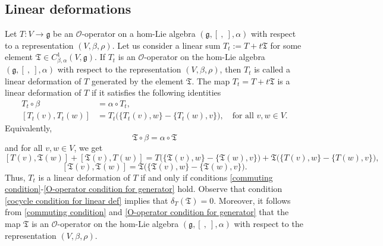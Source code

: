 \documentclass[a4paper,11pt]{amsart}
\theoremstyle{plain}
\theoremstyle{definition}
\theoremstyle{remark}
\numberwithin{equation}{section}
\begin{document}
\subsection{Linear deformations}
Let $T:V\rightarrow \mathfrak{g}$ be an $\mathcal{O}$-operator on a hom-Lie algebra $(\mathfrak{g},[~,~],\alpha)$  with respect to a representation $(V,\beta,\rho)$. Let us consider a linear sum $T_t:=T+t\mathfrak{T}$ for some element $\mathfrak{T}\in C^1_{\beta,\alpha}(V,\mathfrak{g})$. If $T_t$ is an $\mathcal{O}$-operator on the hom-Lie algebra $(\mathfrak{g},[~,~],\alpha)$ with respect to the representation $(V,\beta,\rho)$, then $T_t$ is called a linear deformation of $T$ generated by the element $\mathfrak{T}$. The map $T_t=T+t\mathfrak{T}$ is a linear deformation of $T$ if it satisfies the following identities
\begin{align*}
T_t\circ \beta&=\alpha\circ T_t,\\
[T_t(v),T_t(w)]&=T_t\big(\{T_t(v),w\}-\{T_t(w),v\}\big),\quad\mbox{for all }v,w\in V.
\end{align*}
Equivalently, 
\begin{equation}\label{commuting condition}
\mathfrak{T}\circ \beta =\alpha\circ \mathfrak{T}
\end{equation}
and for all $v,w \in V$, we get
\begin{equation}\label{cocycle condition for linear def}
[T(v),\mathfrak{T}(w)]+[\mathfrak{T}(v),T(w)]=T\big(\{\mathfrak{T}(v),w\}-\{\mathfrak{T}(w),v\}\big)+\mathfrak{T}\big(\{T(v),w\}-\{T(w),v\}\big),
\end{equation} 
\begin{equation}\label{O-operator condition for generator}
[\mathfrak{T}(v),\mathfrak{T}(w)]=\mathfrak{T}\big(\{\mathfrak{T}(v),w\}-\{\mathfrak{T}(w),v\}\big).
\end{equation}
Thus, $T_t$ is a linear deformation of $T$ if and only if conditions \eqref{commuting condition}-\eqref{O-operator condition for generator} hold. Observe that condition \eqref{cocycle condition for linear def} implies that $\delta_T(\mathfrak{T})=0$. Moreover, it follows from \eqref{commuting condition} and \eqref{O-operator condition for generator} that the map $\mathfrak{T}$ is an $\mathcal{O}$-operator on the hom-Lie algebra $(\mathfrak{g},[~,~],\alpha)$ with respect to the representation $(V,\beta,\rho)$.
\end{document}
